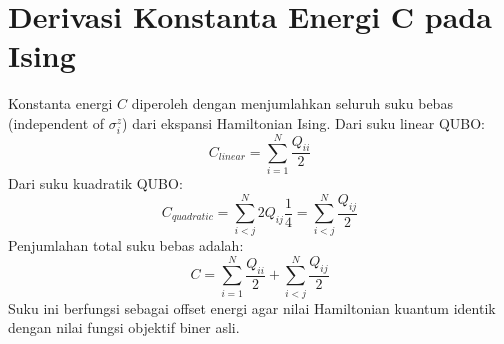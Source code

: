 \section{Derivasi Konstanta Energi C pada Ising}
Konstanta energi $C$ diperoleh dengan menjumlahkan seluruh suku bebas (independent of $\sigma_i^z$) dari ekspansi Hamiltonian Ising.
Dari suku linear QUBO:
\begin{equation}
C_{linear} = \sum_{i=1}^N \frac{Q_{ii}}{2}
\end{equation}
Dari suku kuadratik QUBO:
\begin{equation}
C_{quadratic} = \sum_{i<j}^N 2Q_{ij} \frac{1}{4} = \sum_{i<j}^N \frac{Q_{ij}}{2}
\end{equation}
Penjumlahan total suku bebas adalah:
\begin{equation}
C = \sum_{i=1}^N \frac{Q_{ii}}{2} + \sum_{i<j}^N \frac{Q_{ij}}{2}
\end{equation}
Suku ini berfungsi sebagai offset energi agar nilai Hamiltonian kuantum identik dengan nilai fungsi objektif biner asli.
